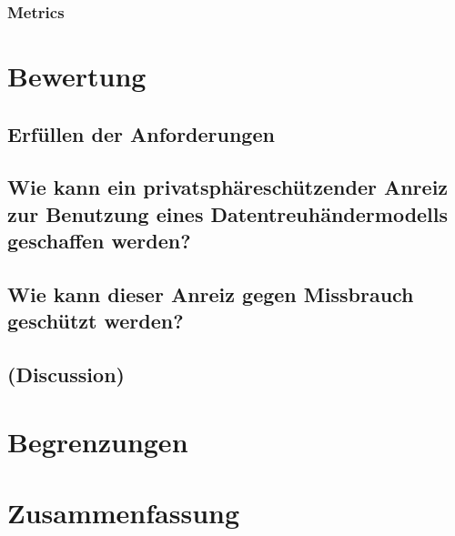 \documentclass[11pt,a4paper]{scrreprt}
\begin{document}
\subsection{Metrics}






\chapter{Bewertung}
\section{Erfüllen der Anforderungen}

\section{Wie kann ein privatsphäreschützender Anreiz zur Benutzung eines Datentreuhändermodells geschaffen werden?}
\section{Wie kann dieser Anreiz gegen Missbrauch geschützt werden?}

\section{(Discussion)}




\chapter{Begrenzungen}



\chapter{Zusammenfassung}
\end{document}
